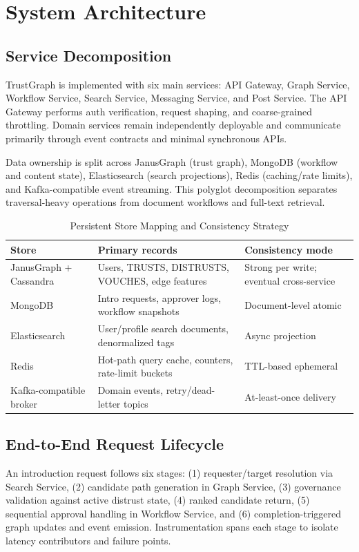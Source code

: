 \documentclass[conference]{IEEEtran}
\begin{document}
\section{System Architecture}
\subsection{Service Decomposition}
TrustGraph is implemented with six main services: API Gateway, Graph Service, Workflow Service, Search Service, Messaging Service, and Post Service. The API Gateway performs auth verification, request shaping, and coarse-grained throttling. Domain services remain independently deployable and communicate primarily through event contracts and minimal synchronous APIs.

Data ownership is split across JanusGraph (trust graph), MongoDB (workflow and content state), Elasticsearch (search projections), Redis (caching/rate limits), and Kafka-compatible event streaming. This polyglot decomposition separates traversal-heavy operations from document workflows and full-text retrieval.

\begin{table}[htbp]
\caption{Persistent Store Mapping and Consistency Strategy}
\label{tab:storage_mapping}
\centering
\begin{tabular}{p{2.2cm}p{4.0cm}p{2.3cm}}
\toprule
Store & Primary records & Consistency mode \\
\midrule
JanusGraph + Cassandra & Users, TRUSTS, DISTRUSTS, VOUCHES, edge features & Strong per write; eventual cross-service \\
MongoDB & Intro requests, approver logs, workflow snapshots & Document-level atomic \\
Elasticsearch & User/profile search documents, denormalized tags & Async projection \\
Redis & Hot-path query cache, counters, rate-limit buckets & TTL-based ephemeral \\
Kafka-compatible broker & Domain events, retry/dead-letter topics & At-least-once delivery \\
\bottomrule
\end{tabular}
\end{table}

\subsection{End-to-End Request Lifecycle}
An introduction request follows six stages: (1) requester/target resolution via Search Service, (2) candidate path generation in Graph Service, (3) governance validation against active distrust state, (4) ranked candidate return, (5) sequential approval handling in Workflow Service, and (6) completion-triggered graph updates and event emission. Instrumentation spans each stage to isolate latency contributors and failure points.
\end{document}
